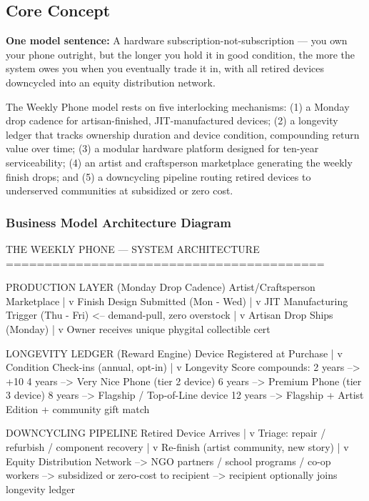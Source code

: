 \documentclass[11pt,letterpaper]{article}
\begin{document}
\subsection{Core Concept}

\textbf{One model sentence:} A hardware subscription-not-subscription --- you own your phone outright, but the longer you hold it in good condition, the more the system owes you when you eventually trade it in, with all retired devices downcycled into an equity distribution network.

The Weekly Phone model rests on five interlocking mechanisms: (1) a Monday drop cadence for artisan-finished, JIT-manufactured devices; (2) a longevity ledger that tracks ownership duration and device condition, compounding return value over time; (3) a modular hardware platform designed for ten-year serviceability; (4) an artist and craftsperson marketplace generating the weekly finish drops; and (5) a downcycling pipeline routing retired devices to underserved communities at subsidized or zero cost.

\subsubsection{Business Model Architecture Diagram}

\begin{asciibox}
THE WEEKLY PHONE --- SYSTEM ARCHITECTURE
=========================================

PRODUCTION LAYER (Monday Drop Cadence)
  Artist/Craftsperson Marketplace
         |
         v
  Finish Design Submitted (Mon - Wed)
         |
         v
  JIT Manufacturing Trigger (Thu - Fri)  <-- demand-pull, zero overstock
         |
         v
  Artisan Drop Ships (Monday)
         |
         v
  Owner receives unique phygital collectible cert

LONGEVITY LEDGER (Reward Engine)
  Device Registered at Purchase
         |
         v
  Condition Check-ins (annual, opt-in)
         |
         v
  Longevity Score compounds:
    2 years  -->  +10%
    4 years  -->  Very Nice Phone (tier 2 device)
    6 years  -->  Premium Phone (tier 3 device)
    8 years  -->  Flagship / Top-of-Line device
   12 years  -->  Flagship + Artist Edition + community gift match

DOWNCYCLING PIPELINE
  Retired Device Arrives
         |
         v
  Triage: repair / refurbish / component recovery
         |
         v
  Re-finish (artist community, new story)
         |
         v
  Equity Distribution Network
    --> NGO partners / school programs / co-op workers
    --> subsidized or zero-cost to recipient
    --> recipient optionally joins longevity ledger
\end{asciibox}
\end{document}
